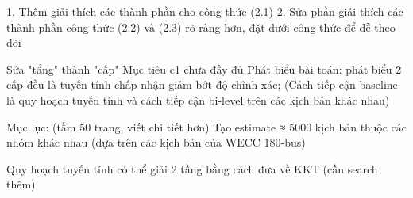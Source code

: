 1. Thêm giải thích các thành phần cho công thức (2.1)
2. Sửa phần giải thích các thành phần công thức (2.2) và (2.3) rõ ràng hơn, đặt dưới công thức để dễ theo dõi


Sửa "tẩng" thành "cấp"
Mục tiêu c1 chưa đầy đủ
Phát biểu bài toán: 
phát biểu 2 cấp đều là tuyến tính chấp nhận giảm bớt độ chĩnh xác;
(Cách tiếp cận baseline là quy hoạch tuyến tính và cách tiếp cận bi-level trên các kịch bản khác nhau)


Mục lục: (tầm 50 trang, viết chi tiết hơn)
Tạo estimate ≈ 5000 kịch bản thuộc các nhóm khác nhau (dựa trên các kịch bản của WECC 180-bus)

Quy hoạch tuyến tính có thể giải 2 tầng bằng cách đưa về KKT (cần search thêm)